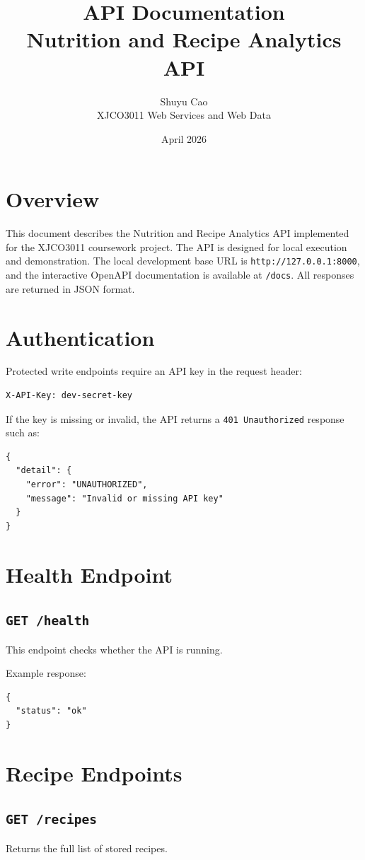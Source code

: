 \documentclass[11pt,a4paper]{article}
\title{\textbf{API Documentation}\\Nutrition and Recipe Analytics API}
\author{Shuyu Cao\\XJCO3011 Web Services and Web Data}
\date{April 2026}
\begin{document}
\maketitle

\section{Overview}
This document describes the Nutrition and Recipe Analytics API implemented for the XJCO3011 coursework project. The API is designed for local execution and demonstration. The local development base URL is \texttt{http://127.0.0.1:8000}, and the interactive OpenAPI documentation is available at \texttt{/docs}. All responses are returned in JSON format.

\section{Authentication}
Protected write endpoints require an API key in the request header:

\begin{lstlisting}[style=jsonstyle]
X-API-Key: dev-secret-key
\end{lstlisting}

If the key is missing or invalid, the API returns a \texttt{401 Unauthorized} response such as:

\begin{lstlisting}[style=jsonstyle]
{
  "detail": {
    "error": "UNAUTHORIZED",
    "message": "Invalid or missing API key"
  }
}
\end{lstlisting}

\section{Health Endpoint}
\subsection*{\texttt{GET /health}}
This endpoint checks whether the API is running.

Example response:
\begin{lstlisting}[style=jsonstyle]
{
  "status": "ok"
}
\end{lstlisting}

\section{Recipe Endpoints}
\subsection*{\texttt{GET /recipes}}
Returns the full list of stored recipes.
\end{document}
